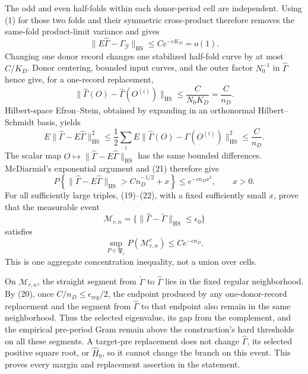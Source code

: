 The odd and even half-folds within each donor-period cell are independent.
Using (1) for those two folds and their symmetric cross-product therefore
removes the same-fold product-limit variance and gives
\[
 \|E\widehat\Gamma-\Gamma_{\mathcal G}\|_{\mathrm{HS}}
 \leq Ce^{-cK_D}=o(1).                                 \tag{19}
\]
Changing one donor record changes one stabilized half-fold curve by at most
\(C/K_D\).  Donor centering, bounded input curves, and the outer factor
\(N_0^{-1}\) in \(\widehat\Gamma\) hence give, for a one-record replacement,
\[
 \|\widehat\Gamma(O)-\widehat\Gamma(O^{(i)})\|_{\mathrm{HS}}
 \leq\frac{C}{N_0K_D}=\frac{C}{n_D}.                  \tag{20}
\]
Hilbert-space Efron--Stein, obtained by expanding in an orthonormal
Hilbert--Schmidt basis, yields
\[
 E\|\widehat\Gamma-E\widehat\Gamma\|_{\mathrm{HS}}^2
 \leq\frac12\sum_iE
 \|\widehat\Gamma(O)-\widehat\Gamma(O^{(i)})\|_{\mathrm{HS}}^2
 \leq\frac{C}{n_D}.                                   \tag{21}
\]
The scalar map
\(O\mapsto\|\widehat\Gamma-E\widehat\Gamma\|_{\mathrm{HS}}\)
has the same bounded differences.  McDiarmid's exponential argument and
(21) therefore give
\[
 P\left\{\|\widehat\Gamma-E\widehat\Gamma\|_{\mathrm{HS}}
 >Cn_D^{-1/2}+x\right\}\leq e^{-cn_Dx^2},
 \qquad x>0.                                           \tag{22}
\]
For all sufficiently large triples, (19)--(22), with a fixed sufficiently
small \(x\), prove that the measurable event
\[
 \mathcal M_{r,n}
 =\{\|\widehat\Gamma-\widetilde\Gamma\|_{\mathrm{HS}}
       \leq\epsilon_0\}                                \tag{23}
\]
satisfies
\[
 \sup_{P\in\mathfrak P_r}P(\mathcal M_{r,n}^c)
 \leq Ce^{-cn_D}.                                      \tag{24}
\]
This is one aggregate concentration inequality, not a union over cells.

On \(\mathcal M_{r,n}\), the straight segment from
\(\widetilde\Gamma\) to \(\widehat\Gamma\) lies in the fixed regular
neighborhood.  By (20), once \(C/n_D\leq\epsilon_{\mathrm{reg}}/2\), the
endpoint produced by any one-donor-record replacement and the segment from
\(\widehat\Gamma\) to that endpoint also remain in the same neighborhood.
Thus the selected eigenvalue, its gap from the complement, and the empirical
pre-period Gram remain above the construction's hard thresholds on all these
segments.  A target-pre replacement does not change \(\widehat\Gamma\), its
selected positive square root, or \(\widehat H_0\), so it cannot change the
branch on this event.  This proves every margin and replacement assertion in
the statement.

